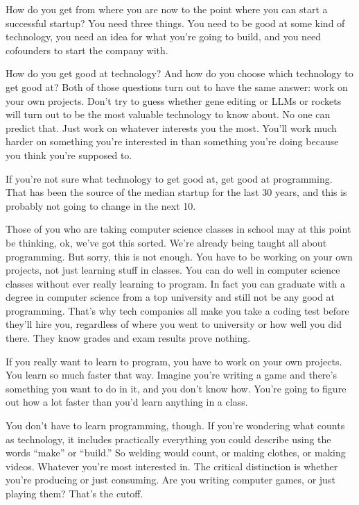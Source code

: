 \documentclass[12pt]{book}
\begin{document}
How do you get from where you are now to the point where you can start a
successful startup? You need three things. You need to be good at some
kind of technology, you need an idea for what you're going to build, and
you need cofounders to start the company with.

How do you get good at technology? And how do you choose which
technology to get good at? Both of those questions turn out to have the
same answer: work on your own projects. Don't try to guess whether gene
editing or LLMs or rockets will turn out to be the most valuable
technology to know about. No one can predict that. Just work on whatever
interests you the most. You'll work much harder on something you're
interested in than something you're doing because you think you're
supposed to.

If you're not sure what technology to get good at, get good at
programming. That has been the source of the median startup for the last
30 years, and this is probably not going to change in the next 10.

Those of you who are taking computer science classes in school may at
this point be thinking, ok, we've got this sorted. We're already being
taught all about programming. But sorry, this is not enough. You have to
be working on your own projects, not just learning stuff in classes. You
can do well in computer science classes without ever really learning to
program. In fact you can graduate with a degree in computer science from
a top university and still not be any good at programming. That's why
tech companies all make you take a coding test before they'll hire you,
regardless of where you went to university or how well you did there.
They know grades and exam results prove nothing.

If you really want to learn to program, you have to work on your own
projects. You learn so much faster that way. Imagine you're writing a
game and there's something you want to do in it, and you don't know how.
You're going to figure out how a lot faster than you'd learn anything in
a class.

You don't have to learn programming, though. If you're wondering what
counts as technology, it includes practically everything you could
describe using the words ``make'' or ``build.'' So welding would count,
or making clothes, or making videos. Whatever you're most interested in.
The critical distinction is whether you're producing or just consuming.
Are you writing computer games, or just playing them? That's the cutoff.
\end{document}
